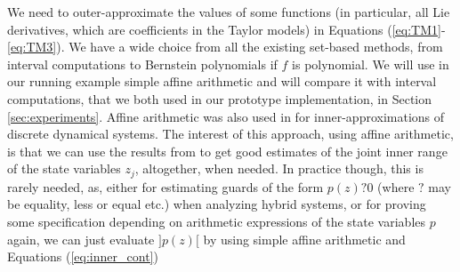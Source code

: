 \documentclass{sig-alternate-05-2015} %
\begin{document}
We need to outer-approximate the values of some functions (in particular, all Lie
derivatives, which are coefficients in the Taylor models) in Equations 
(\ref{eq:TM1}-\ref{eq:TM3}). We have a wide choice from all the existing set-based
methods, from interval computations to Bernstein polynomials \cite{Dang} if $f$
is polynomial. We will use in our running example simple affine arithmetic
\cite{com-sto-93-aa} and will compare it with interval computations, that we
both used in our prototype implementation, in Section \ref{sec:experiments}. 
Affine arithmetic was also used in \cite{hscc14} for inner-approximations of
discrete dynamical systems. The interest of this approach, using affine arithmetic,
is that we can use the results from \cite{rc13} to get good estimates of the
joint inner range of the state variables $z_j$, altogether, when needed. In practice
though, this is rarely needed, as, either for estimating guards of the form
$p(z) ? 0$ (where $?$ may be equality, less or equal etc.) when analyzing
hybrid systems, or for proving some specification depending on arithmetic expressions of
the state variables $p$ again, we can just evaluate $]p(z)[$ by using simple
affine arithmetic and 
Equations (\ref{eq:inner_cont})
\end{document}
